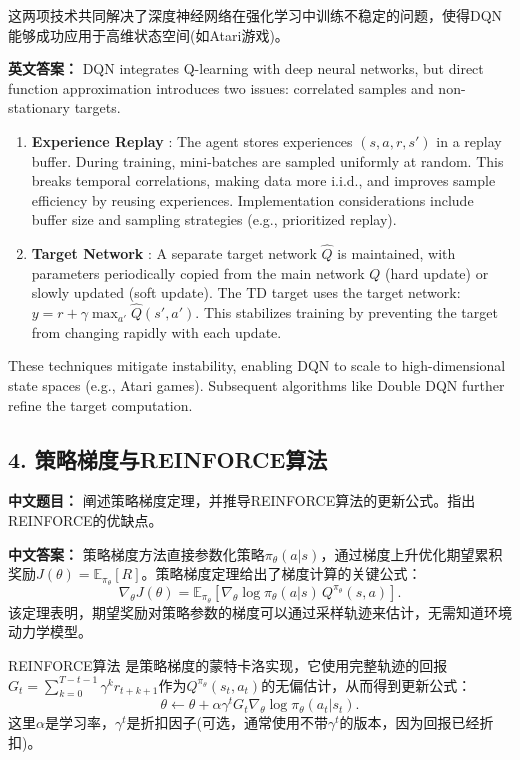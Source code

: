 \documentclass[10pt,a4paper]{ctexart}
\begin{document}
这两项技术共同解决了深度神经网络在强化学习中训练不稳定的问题，使得DQN能够成功应用于高维状态空间(如Atari游戏)。

\textbf{英文答案：}  
DQN integrates Q-learning with deep neural networks, but direct function approximation introduces two issues: correlated samples and non-stationary targets.

\begin{enumerate}
    \item \textbf{Experience Replay} : The agent stores experiences \((s,a,r,s')\) in a replay buffer. During training, mini-batches are sampled uniformly at random. This breaks temporal correlations, making data more i.i.d., and improves sample efficiency by reusing experiences. Implementation considerations include buffer size and sampling strategies (e.g., prioritized replay).

    \item \textbf{Target Network} : A separate target network \(\hat{Q}\) is maintained, with parameters periodically copied from the main network \(Q\) (hard update) or slowly updated (soft update). The TD target uses the target network: \(y = r + \gamma \max_{a'} \hat{Q}(s',a')\). This stabilizes training by preventing the target from changing rapidly with each update.
\end{enumerate}

These techniques mitigate instability, enabling DQN to scale to high-dimensional state spaces (e.g., Atari games). Subsequent algorithms like Double DQN further refine the target computation.

\subsection*{4. 策略梯度与REINFORCE算法}
\textbf{中文题目：} 阐述策略梯度定理，并推导REINFORCE算法的更新公式。指出REINFORCE的优缺点。

\textbf{中文答案：}  
策略梯度方法直接参数化策略\(\pi_\theta(a|s)\)，通过梯度上升优化期望累积奖励\(J(\theta)=\mathbb{E}_{\pi_\theta}[R]\)。策略梯度定理给出了梯度计算的关键公式：
\[
\nabla_\theta J(\theta) = \mathbb{E}_{\pi_\theta} \left[ \nabla_\theta \log \pi_\theta(a|s) \, Q^{\pi_\theta}(s,a) \right].
\]  
该定理表明，期望奖励对策略参数的梯度可以通过采样轨迹来估计，无需知道环境动力学模型。

 REINFORCE算法 是策略梯度的蒙特卡洛实现，它使用完整轨迹的回报\(G_t = \sum_{k=0}^{T-t-1} \gamma^k r_{t+k+1}\)作为\(Q^{\pi_\theta}(s_t,a_t)\)的无偏估计，从而得到更新公式：
\[
\theta \leftarrow \theta + \alpha \gamma^t G_t \nabla_\theta \log \pi_\theta(a_t|s_t).
\]  
这里\(\alpha\)是学习率，\(\gamma^t\)是折扣因子(可选，通常使用不带\(\gamma^t\)的版本，因为回报已经折扣)。
\end{document}
